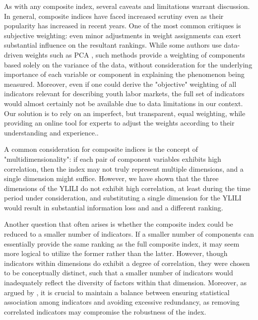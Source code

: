 \documentclass[
  a4paper, twoside, 12pt]{book}
\renewcommand{\hl}[1]{#1}
\begin{document}
As with any composite index, several caveats and limitations warrant discussion. In general, composite indices have faced increased scrutiny even as their popularity has increased in recent years. \hl{One of the most common critiques is subjective weighting: even minor adjustments in weight assignments can exert substantial influence on the resultant rankings.  While some authors use data-driven weights such as PCA }\autocite{becker2017}\hl{, such methods provide a weighting of components based solely on the variance of the data, without consideration for the underlying importance of each variable or component in explaining the phenomenon being measured. Moreover, even if one could derive the "objective" weighting of all indicators relevant for describing youth labor markets, the full set of indicators would almost certainly not be available due to data limitations in our context. Our solution is to rely on an imperfect, but transparent, equal weighting, while providing an online tool for experts to adjust the weights according to their understanding and experience..}


\hl{A common consideration for composite indices is the concept of "multidimensionality": if each pair of component variables exhibits high correlation, then the index may not truly represent multiple dimensions, and a single dimension might suffice. However, we have shown that the three dimensions of the YLILI do not exhibit high correlation, at least during the time period under consideration, and substituting a single dimension for the YLILI would result in substantial information loss and and a different ranking.}


\hl{Another question that often arises is whether the composite index could be reduced to a smaller number of indicators. If a smaller number of components can essentially provide the same ranking as the full composite index, it may seem more logical to utilize the former rather than the latter. However, though indicators within dimensions do exhibit a degree of correlation, they were chosen to be conceptually distinct, such that a smaller number of indicators would inadequately reflect the diversity of factors within that dimension. Moreover, as argued by} \autocite{foster2013}\hl{, it is crucial to maintain a balance between ensuring statistical association among indicators and avoiding excessive redundancy, as removing correlated indicators may compromise the robustness of the index.}
\end{document}
